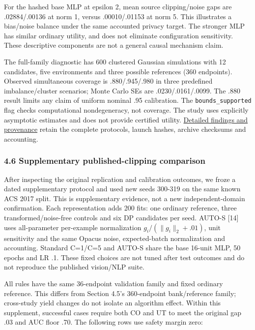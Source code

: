 \documentclass[
  10pt,
]{article}
\begin{document}
For the hashed base MLP at epsilon 2, mean source clipping/noise gaps
are .02884/.00136 at norm 1, versus .00010/.01153 at norm 5. This
illustrates a bias/noise balance under the same accounted privacy
target. The stronger MLP has similar ordinary utility, and does not
eliminate configuration sensitivity. These descriptive components are
not a general causal mechanism claim.

The full-family diagnostic has 600 clustered Gaussian simulations with
12 candidates, five environments and three possible references (360
endpoints). Observed simultaneous coverage is .880/.945/.980 in three
predefined imbalance/cluster scenarios; Monte Carlo SEs are
.0230/.0161/.0099. The .880 result limits any claim of uniform nominal
.95 calibration. The \texttt{bounds\_supported} flag checks
computational nondegeneracy, not coverage. The study uses explicitly
asymptotic estimates and does not provide certified utility.
\href{../reports/configuration_selection/FINDINGS.md}{Detailed findings
and provenance} retain the complete protocols, launch hashes, archive
checksums and accounting.

\hypertarget{supplementary-published-clipping-comparison}{%
\subsubsection{4.6 Supplementary published-clipping
comparison}\label{supplementary-published-clipping-comparison}}

After inspecting the original replication and calibration outcomes, we
froze a dated supplementary protocol and used new seeds 300-319 on the
same known ACS 2017 split. This is supplementary evidence, not a new
independent-domain confirmation. Each representation adds 200 fits: one
ordinary reference, three transformed/noise-free controls and six DP
candidates per seed. AUTO-S {[}14{]} uses all-parameter per-example
normalization \(g_i/(\lVert g_i\rVert_2+.01)\), unit sensitivity and the
same Opacus noise, expected-batch normalization and accounting. Standard
C=1/C=5 and AUTO-S share the base 16-unit MLP, 50 epochs and LR .1.
These fixed choices are not tuned after test outcomes and do not
reproduce the published vision/NLP suite.

All rules have the same 36-endpoint validation family and fixed ordinary
reference. This differs from Section 4.5's 360-endpoint bank/reference
family; cross-study yield changes do not isolate an algorithm effect.
Within this supplement, successful cases require both CO and UT to meet
the original gap .03 and AUC floor .70. The following rows use safety
margin zero:
\end{document}
